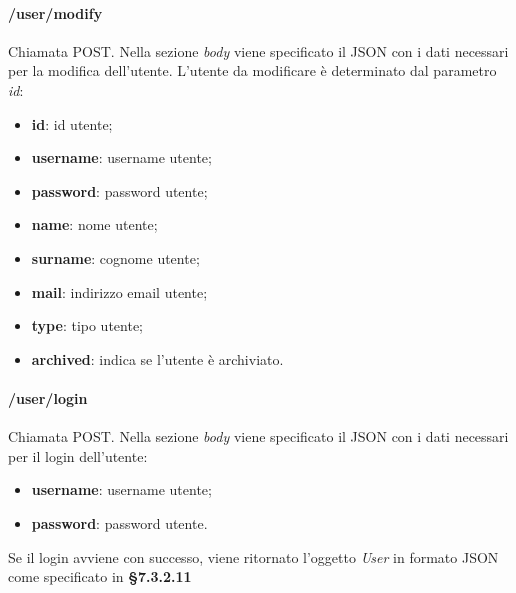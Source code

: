 \paragraph{/user/modify}
Chiamata POST. Nella sezione \textit{body} viene specificato il JSON con i dati necessari per la modifica dell'utente. L'utente da modificare è determinato dal parametro \textit{id}:
\begin{itemize}
	\item \textbf{id}: id utente;
	\item \textbf{username}: username utente;
	\item \textbf{password}: password utente;
	\item \textbf{name}: nome utente;
	\item \textbf{surname}: cognome utente;	
	\item \textbf{mail}: indirizzo email utente;	
	\item \textbf{type}: tipo utente;	
	\item \textbf{archived}: indica se l'utente è archiviato.	
\end{itemize}

\paragraph{/user/login}
Chiamata POST. Nella sezione \textit{body} viene specificato il JSON con i dati necessari per il login dell'utente:
\begin{itemize}
	\item \textbf{username}: username utente;
	\item \textbf{password}: password utente.	
\end{itemize}
Se il login avviene con successo, viene ritornato l'oggetto \textit{User} in formato JSON come specificato in \textbf{§7.3.2.11}
